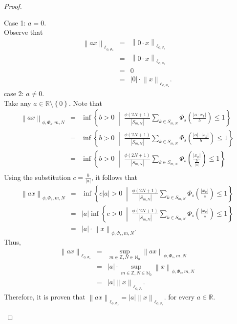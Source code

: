 \documentclass[10pt,a4paper]{amsart}
\begin{document}
\begin{proof}
\begin{enumerate}
        Case 1: $a = 0$.\\
        Observe that
        \begin{eqnarray*}
            \left\lVert ax \right\rVert _{\ell_{\phi,\Phi_s}}&=&\left\lVert 0\cdot x \right\rVert _{\ell_{\phi,\Phi_s}}\\
            &=&\left\lVert 0\cdot x \right\rVert _{\ell_{\phi,\Phi_s}}\\
            &=&0\\
            &=&\left|0\right|\cdot\left\lVert x \right\rVert _{\ell_{\phi,\Phi_s}}.
        \end{eqnarray*}
        case 2: $a \neq 0$.\\
        Take any $a \in \mathbb{R} \setminus \left\{0\right\}$. Note that
        \begin{eqnarray*}
            \left\lVert ax \right\rVert _{\phi, \Phi_s, m, N}&=&\inf \left\{b > 0 \;\middle|\; \frac{\phi\left(2N+1\right)}{\left|S_{m,N}\right|}\sum_{k\in S_{m,N}}\Phi_s\left(\frac{\left|a\cdot x_k\right|}{b}\right) \leq 1\right\}\\
            &=&\inf \left\{b > 0 \;\middle|\; \frac{\phi\left(2N+1\right)}{\left|S_{m,N}\right|}\sum_{k\in S_{m,N}}\Phi_s\left(\frac{\left|a\right|\cdot\left|x_k\right|}{b}\right) \leq 1\right\}\\
            &=&\inf \left\{b > 0 \;\middle|\; \frac{\phi\left(2N+1\right)}{\left|S_{m,N}\right|}\sum_{k\in S_{m,N}}\Phi_s\left(\frac{\left|x_k\right|}{\frac{b}{\left|a\right|}}\right) \leq 1\right\}\\
        \end{eqnarray*}
        Using the substitution $c = \frac{b}{\left|a\right|}$, it follows that
        \begin{eqnarray*}
            \left\lVert ax \right\rVert _{\phi, \Phi_s, m, N}&=&\inf \left\{c\left|a\right|> 0 \;\middle|\; \frac{\phi\left(2N+1\right)}{\left|S_{m,N}\right|}\sum_{k\in S_{m,N}}\Phi_s\left(\frac{\left|x_k\right|}{c}\right) \leq 1\right\}\\
            &=&\left|a\right|\inf \left\{c > 0 \;\middle|\; \frac{\phi\left(2N+1\right)}{\left|S_{m,N}\right|}\sum_{k\in S_{m,N}}\Phi_s\left(\frac{\left|x_k\right|}{c}\right) \leq 1\right\}\\
            &=&\left|a\right|\cdot\left\lVert x \right\rVert _{\phi, \Phi_s, m, N}.
        \end{eqnarray*}
        Thus,
        \begin{eqnarray*}
            \left\lVert ax \right\rVert _{\ell_{\phi,\Phi_s}}&=&\sup_{m \in \mathbb{Z}, N \in \mathbb{N}_0} \left\lVert a x\right\rVert_{\phi, \Phi_s, m, N}\\
            &=& \left|a\right|\cdot\sup_{m \in \mathbb{Z}, N \in \mathbb{N}_0} \left\lVert x\right\lVert_{\phi, \Phi_s, m, N}\\ 
            &=& \left| a\right| \left\lVert x\right\lVert_{\ell_{\phi, \Phi_s}}.
        \end{eqnarray*}
        Therefore, it is proven that $\left\lVert ax \right\rVert _{\ell_{\phi,\Phi_s}}=\left| a\right| \left\lVert x\right\lVert_{\ell_{\phi, \Phi_s}}$. for every $a\in \mathbb{R}$.
        

\end{enumerate}
\end{proof}
\end{document}

